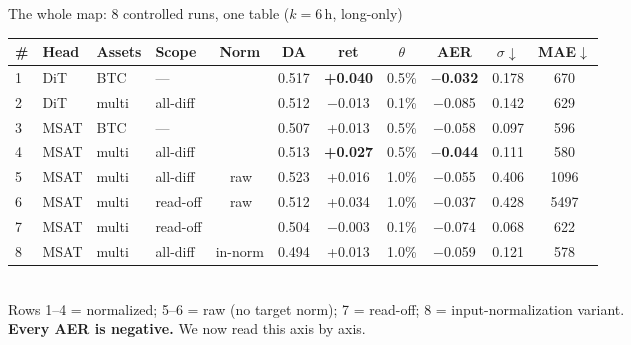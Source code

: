 \documentclass[10pt,aspectratio=169]{beamer}
\newcommand{\gd}[1]{\textbf{\textcolor{good}{#1}}}
\newcommand{\bd}[1]{\textcolor{bad}{#1}}
\newcommand{\yes}{\textcolor{good}{\ding{51}}}
\newcommand{\no}{\textcolor{bad}{\ding{55}}}
\begin{document}
\begin{frame}{The whole map: 8 controlled runs, one table \hfill\normalfont\small($k{=}6$\,h, long-only)}
\centering\scriptsize
\setlength{\tabcolsep}{4pt}
\begin{tabular}{@{}llll c cc c c cc@{}}
\toprule
\# & Head & Assets & Scope & Norm & DA & ret & $\theta$ & AER & $\sigma\!\downarrow$ & MAE$\downarrow$ \\ \midrule
1 & DiT  & BTC   & ---      & \yes & 0.517 & \gd{+0.040} & 0.5\% & \gd{$-$0.032} & 0.178 & 670 \\
2 & DiT  & multi & all-diff & \yes & 0.512 & \bd{$-$0.013} & 0.1\% & $-$0.085 & 0.142 & 629 \\
3 & MSAT & BTC   & ---      & \yes & 0.507 & +0.013 & 0.5\% & $-$0.058 & 0.097 & 596 \\
\rowcolor{hl}
4 & MSAT & multi & all-diff & \yes & 0.513 & \gd{+0.027} & 0.5\% & \gd{$-$0.044} & 0.111 & 580 \\
5 & MSAT & multi & all-diff & \no\,raw   & 0.523 & +0.016 & 1.0\% & $-$0.055 & \bd{0.406} & \bd{1096} \\
6 & MSAT & multi & read-off & \no\,raw   & 0.512 & +0.034 & 1.0\% & $-$0.037 & \bd{0.428} & \bd{5497} \\
7 & MSAT & multi & read-off & \yes & 0.504 & $-$0.003 & 0.1\% & $-$0.074 & 0.068 & 622 \\
8 & MSAT & multi & all-diff & in-norm    & 0.494 & +0.013 & 1.0\% & $-$0.059 & 0.121 & 578 \\
\bottomrule
\end{tabular}
\\[0.7em]
\footnotesize
Rows 1--4 = normalized; 5--6 = raw (no target norm); 7 = read-off; 8 = input-normalization variant.\\
\textbf{Every AER is negative.} We now read this axis by axis.
\end{frame}
\end{document}
